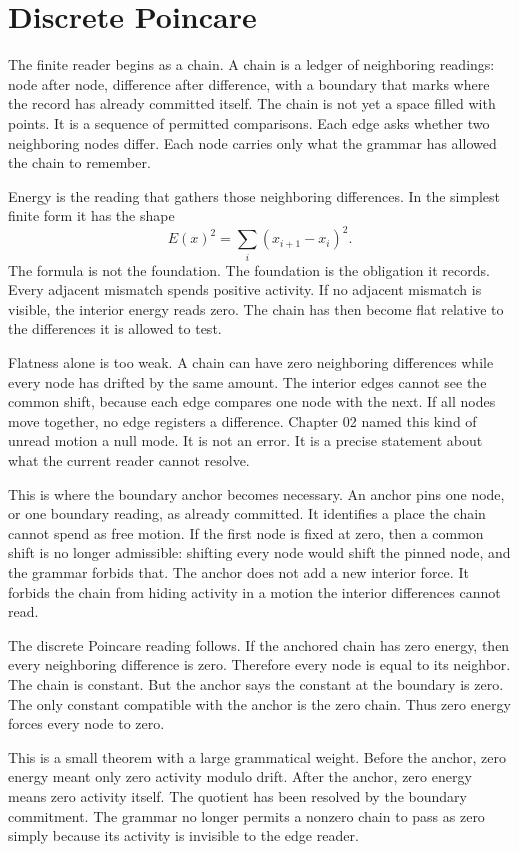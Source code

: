 \section{Discrete Poincare}

The finite reader begins as a chain. A chain is a ledger of neighboring
readings: node after node, difference after difference, with a boundary that
marks where the record has already committed itself. The chain is not yet a
space filled with points. It is a sequence of permitted comparisons. Each
edge asks whether two neighboring nodes differ. Each node carries only what
the grammar has allowed the chain to remember.

Energy is the reading that gathers those neighboring differences. In the
simplest finite form it has the shape
\[
  E(x)^2 = \sum_i (x_{i+1}-x_i)^2 .
\]
The formula is not the foundation. The foundation is the obligation it
records. Every adjacent mismatch spends positive activity. If no adjacent
mismatch is visible, the interior energy reads zero. The chain has then
become flat relative to the differences it is allowed to test.

Flatness alone is too weak. A chain can have zero neighboring differences
while every node has drifted by the same amount. The interior edges cannot
see the common shift, because each edge compares one node with the next. If
all nodes move together, no edge registers a difference. Chapter 02 named
this kind of unread motion a null mode. It is not an error. It is a precise
statement about what the current reader cannot resolve.

This is where the boundary anchor becomes necessary. An anchor pins one
node, or one boundary reading, as already committed. It identifies a place
the chain cannot spend as free motion. If the first node is fixed at zero,
then a common shift is no longer admissible: shifting every node would shift
the pinned node, and the grammar forbids that. The anchor does not add a new
interior force. It forbids the chain from hiding activity in a motion the
interior differences cannot read.

The discrete Poincare reading follows. If the anchored chain has zero
energy, then every neighboring difference is zero. Therefore every node is
equal to its neighbor. The chain is constant. But the anchor says the
constant at the boundary is zero. The only constant compatible with the
anchor is the zero chain. Thus zero energy forces every node to zero.

This is a small theorem with a large grammatical weight. Before the anchor,
zero energy meant only zero activity modulo drift. After the anchor, zero
energy means zero activity itself. The quotient has been resolved by the
boundary commitment. The grammar no longer permits a nonzero chain to pass
as zero simply because its activity is invisible to the edge reader.

